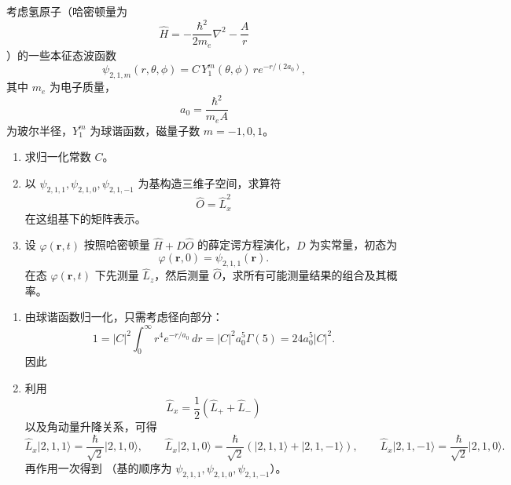 \begin{question}
考虑氢原子（哈密顿量为
\[
\hat H=-\frac{\hbar^2}{2m_e}\nabla^2-\frac{A}{r}
\]
）的一些本征态波函数
\[
\psi_{2,1,m}(r,\theta,\phi)=C\,Y_1^m(\theta,\phi)\,r e^{-r/(2a_0)},
\]
其中 $m_e$ 为电子质量，
\[
a_0=\frac{\hbar^2}{m_eA}
\]
为玻尔半径，$Y_1^m$ 为球谐函数，磁量子数 $m=-1,0,1$。

\begin{enumerate}[label=(\arabic*),leftmargin=2.5em]
  \item 求归一化常数 $C$。
  \item 以 $\psi_{2,1,1},\psi_{2,1,0},\psi_{2,1,-1}$ 为基构造三维子空间，求算符
  \[
  \hat O=\hat L_x^2
  \]
  在这组基下的矩阵表示。
  \item 设 $\varphi(\mathbf r,t)$ 按照哈密顿量 $\hat H+D\hat O$ 的薛定谔方程演化，$D$ 为实常量，初态为
  \[
  \varphi(\mathbf r,0)=\psi_{2,1,1}(\mathbf r).
  \]
  在态 $\varphi(\mathbf r,t)$ 下先测量 $\hat L_z$，然后测量 $\hat O$，求所有可能测量结果的组合及其概率。
\end{enumerate}

\begin{solution}
\begin{enumerate}[label=(\arabic*),leftmargin=2.5em]
  \item 由球谐函数归一化，只需考虑径向部分：
  \[
  1=|C|^2\int_0^{\infty}r^4e^{-r/a_0}\,dr
  =|C|^2 a_0^5\Gamma(5)=24a_0^5|C|^2.
  \]
  因此

  \item 利用
  \[
  \hat L_x=\frac12(\hat L_++\hat L_-)
  \]
  以及角动量升降关系，可得
  \[
  \hat L_x\lvert 2,1,1\rangle=\frac{\hbar}{\sqrt2}\lvert 2,1,0\rangle,
  \qquad
  \hat L_x\lvert 2,1,0\rangle=\frac{\hbar}{\sqrt2}(\lvert 2,1,1\rangle+\lvert 2,1,-1\rangle),
  \qquad
  \hat L_x\lvert 2,1,-1\rangle=\frac{\hbar}{\sqrt2}\lvert 2,1,0\rangle.
  \]
  再作用一次得到
  （基的顺序为 $\psi_{2,1,1},\psi_{2,1,0},\psi_{2,1,-1}$）。


\end{enumerate}
\end{solution}
\end{question}
